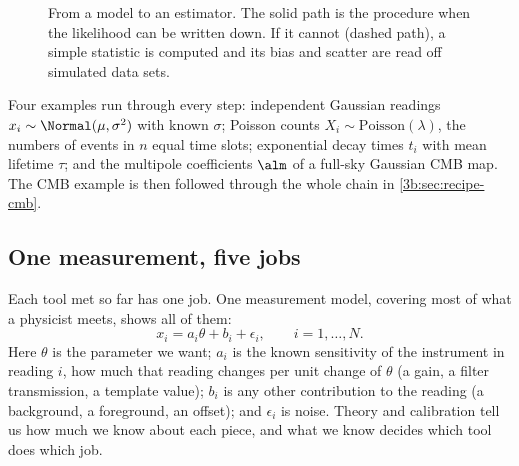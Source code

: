 \begin{figure}[htbp]
\centering
{}
\caption{From a model to an estimator. The solid path is the procedure when
the likelihood can be written down. If it cannot (dashed path), a simple
statistic is computed and its bias and scatter are read off simulated
data sets.}
\label{3b:fig:recipe-flow}
\end{figure}

Four examples run through every step: independent Gaussian readings
$x_i\sim\Normal(\mu,\sigma^2)$ with known $\sigma$; Poisson counts
$X_i\sim\mathrm{Poisson}(\lambda)$, the numbers of events in $n$ equal time
slots; exponential decay times $t_i$ with mean lifetime $\tau$; and the
multipole coefficients $\alm$ of a full-sky Gaussian CMB map. The CMB
example is then followed through the whole chain in
\cref{3b:sec:recipe-cmb}.

\subsection{One measurement, five jobs}
\label{3b:sec:recipe-jobs}

Each tool met so far has one job. One measurement model, covering most of what a physicist meets, shows all of them:
\begin{equation}
x_i=a_i\theta+b_i+\epsilon_i,\qquad i=1,\dots,N .
\label{3b:eq:jobs-model}
\end{equation}
Here $\theta$ is the parameter we want; $a_i$ is the known sensitivity of the instrument in reading $i$, how much that reading changes per unit change of $\theta$ (a gain, a filter transmission, a template value); $b_i$ is any other contribution to the reading (a background, a foreground, an offset); and $\epsilon_i$ is noise. Theory and calibration tell us how much we know about each piece, and what we know decides which tool does which job.

